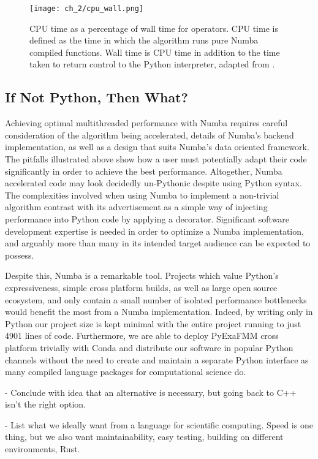  \begin{figure}
	\centerline{\texttt{[image: ch\_2/cpu\_wall.png]}}
    \caption{CPU time as a percentage of wall time for operators. CPU time is defined as the time in which the algorithm runs pure Numba compiled functions. Wall time is CPU time in addition to the time taken to return control to the Python interpreter, adapted from \cite{kailasa2022pyexafmm}. } 
	\label{fig:sec_2_2:cpu_wall}
\end{figure}


\subsection*{If Not Python, Then What?}

Achieving optimal multithreaded performance with Numba requires careful consideration of the algorithm being accelerated, details of Numba's backend implementation, as well as a design that suits Numba's data oriented framework. The pitfalls illustrated above show how a user must potentially adapt their code significantly in order to achieve the best performance. Altogether, Numba accelerated code may look decidedly un-Pythonic despite using Python syntax. The complexities involved when using Numba to implement a non-trivial algorithm contrast with its advertisement as a simple way of injecting performance into Python code by applying a decorator. Significant software development expertise is needed in order to optimize a Numba implementation, and arguably more than many in its intended target audience can be expected to possess. 

Despite this, Numba is a remarkable tool. Projects which value Python's expressiveness, simple cross platform builds, as well as large open source ecosystem, and only contain a small number of isolated performance bottlenecks would benefit the most from a Numba implementation. Indeed, by writing only in Python our project size is kept minimal with the entire project running to just 4901 lines of code. Furthermore, we are able to deploy PyExaFMM cross platform trivially with Conda and distribute our software in popular Python channels without the need to create and maintain a separate Python interface as many compiled language packages for computational science do. 

- Conclude with idea that an alternative is necessary, but going back to C++ isn't the right option.

- List what we ideally want from a language for scientific computing. Speed is one thing, but we also want maintainability, easy testing, building on different environments, Rust.


